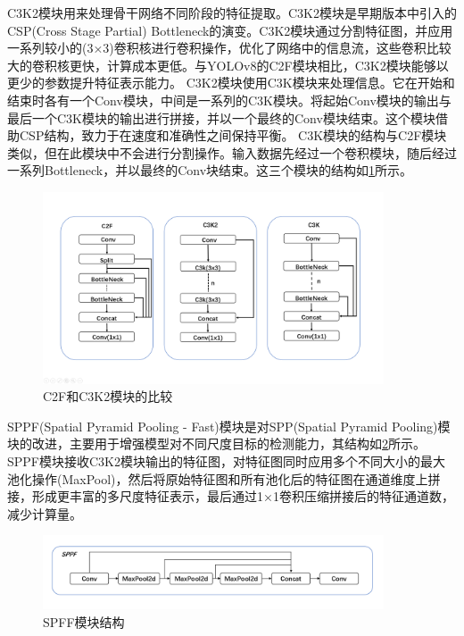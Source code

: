 C3K2模块用来处理骨干网络不同阶段的特征提取。C3K2模块是早期版本中引入的CSP(Cross Stage Partial) Bottleneck的演变。C3K2模块通过分割特征图，并应用一系列较小的(3×3)卷积核进行卷积操作，优化了网络中的信息流，这些卷积比较大的卷积核更快，计算成本更低。与YOLOv8的C2F模块相比，C3K2模块能够以更少的参数提升特征表示能力。
C3K2模块使用C3K模块来处理信息。它在开始和结束时各有一个Conv模块，中间是一系列的C3K模块。将起始Conv模块的输出与最后一个C3K模块的输出进行拼接，并以一个最终的Conv模块结束。这个模块借助CSP结构，致力于在速度和准确性之间保持平衡。
C3K模块的结构与C2F模块类似，但在此模块中不会进行分割操作。输入数据先经过一个卷积模块，随后经过一系列Bottleneck，并以最终的Conv块结束。这三个模块的结构如\ref{fig:c3k}所示。

\begin{figure}[!htb]
  \centering
  \includegraphics[width=0.9\textwidth]{figs/chap02/c2f.png}
  \caption{C2F和C3K2模块的比较}
  \label{fig:c3k}
\end{figure}

SPPF(Spatial Pyramid Pooling - Fast)模块是对SPP(Spatial Pyramid Pooling)模块的改进，主要用于增强模型对不同尺度目标的检测能力，其结构如\ref{fig:sppf}所示。SPPF模块接收C3K2模块输出的特征图，对特征图同时应用多个不同大小的最大池化操作(MaxPool)，然后将原始特征图和所有池化后的特征图在通道维度上拼接，形成更丰富的多尺度特征表示，最后通过1×1卷积压缩拼接后的特征通道数，减少计算量。

\begin{figure}[!htb]
  \centering
  \includegraphics[width=0.9\textwidth]{figs/chap02/sppf.png}
  \caption{SPFF模块结构}
  \label{fig:sppf}
\end{figure}


